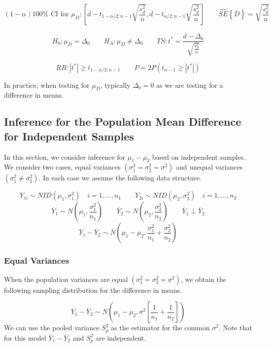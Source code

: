 \documentclass[
]{book}
\begin{document}
\[
(1-\alpha)100\% \mbox{ CI for } \mu_D:
\left[\overline{d}-t_{1-\alpha/2;n-1}\sqrt{\frac{s_d^2}{n}},
\overline{d}-t_{\alpha/2;n-1}\sqrt{\frac{s_d^2}{n}}\right]
\qquad \hat{SE}\left\{\overline{D}\right\}=\sqrt{\frac{s_d^2}{n}}
\]

\[
H_0:\mu_D=\Delta_0 \qquad H_A:\mu_D \neq \Delta_0 \qquad 
TS:t^*=\frac{\overline{d}-\Delta_0}{\sqrt{\frac{s_d^2}{n}}}
\]

\[
RR:|t^*|\geq t_{1-\alpha/2;n-1} 
\qquad P=2P\left(t_{n-1}\geq|t^*|\right)
\]

In practice, when testing for \(\mu_D\), typically \(\Delta_0=0\) as we
are testing for a difference in means.

\subsection{Inference for the Population Mean Difference for Independent
Samples}\label{inference-for-the-population-mean-difference-for-independent-samples}

In this section, we consider inference for \(\mu_1-\mu_2\) based on
independent samples. We consider two cases, equal variances
\(\left(\sigma_1^2=\sigma_2^2=\sigma^2\right)\) and unequal variances
\(\left(\sigma_1^2\neq\sigma_2^2\right)\). In each case we assume the
following data structure.

\[Y_{1i} \sim NID\left(\mu_1,\sigma_1^2\right) \quad i=1,\ldots,n_1 \qquad 
Y_{2i} \sim NID\left(\mu_2,\sigma_2^2\right) \quad i=1,\ldots,n_2
\] \[
\overline{Y}_1 \sim N\left(\mu_1,\frac{\sigma_1^2}{n_1}\right)  \qquad
\overline{Y}_2 \sim N\left(\mu_2,\frac{\sigma_2^2}{n_2}\right) \qquad 
\overline{Y}_1 \perp \overline{Y}_2
\] \[
\overline{Y}_1 - \overline{Y}_2 \sim 
N\left(\mu_1-\mu_2,\frac{\sigma_1^2}{n_1}+\frac{\sigma_2^2}{n_2}\right)
\]

\subsubsection{Equal Variances}\label{equal-variances}

When the population variances are equal
\(\left(\sigma_1^2=\sigma_2^2=\sigma^2\right)\), we obtain the following
sampling distribution for the difference in means.

\[
\overline{Y}_1 - \overline{Y}_2 \sim 
N\left(\mu_1-\mu_2,\sigma^2\left[\frac{1}{n_1}+\frac{1}{n_2}\right]\right)
\] We can use the pooled variance \(S_p^2\) as the estimator for the
common \(\sigma^2\). Note that for this model
\(\overline{Y}_1 - \overline{Y}_2\) and \(S_p^2\) are independent.
\end{document}

